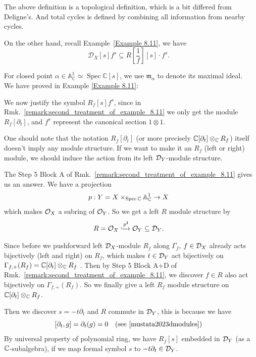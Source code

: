 The above definition is a topological definition, which is a bit differed from Deligne's. And total cycles is defined by combining all information from nearby cycles.


On the other hand, recall Example~\ref{Example 8.11}, we have
$$
    \mathcal{D}_{X}[s]f^{s} \subseteq R\left[\frac{1}{f}\right][s] \cdot f^{s}.
$$

For closed point $\alpha \in \mathbb{A}_{\mathbb{C}}^{1} \simeq \operatorname{Spec} \mathbb{C}[s]$, we use $\mathfrak{m}_{\alpha}$ to denote its maximal ideal. We have proved in Example \ref{Example 8.11}:

\begin{remark}\label{rmk:justify_R_f[s]f^s}
    We now justify the symbol $R_f[s]f^s$,
    since in Rmk.~\ref{remark:second_treatment_of_example_8.11} we only get the module $R_f[\partial_t]$,
    and $f^s$ represent the canonical section $1\otimes 1$.

    One should note that the notation $R_f[\partial_t]$ (or more precisely $\mathbb{C}[\partial_t]\otimes_{\mathbb{C}} R_f$) itself doesn't imply any module structure.
    If we want to make it an $R_f$ (left or right) module, we should induce the action from its left $\mathcal{D}_Y$-module structure.

    The Step 5 Block A of Rmk.~\ref{remark:second_treatment_of_example_8.11} gives us an answer.
    We have a projection
    \[
        p: Y = X\times_{\operatorname{Spec} \mathbb{C}}\mathbb{A}^1_{\mathbb{C}} \to X
    \]
    which makes $\mathcal{O}_X$ a subring of $\mathcal{O}_Y$.
    So we get a left $R$ module structure by
    \[
        R=\mathcal{O}_X\xhookrightarrow{p^\sharp} \mathcal{O}_Y \subseteq \mathcal{D}_Y.
    \]

    Since before we pushforward left $\mathcal{D}_X$-module $R_f$ along $\Gamma_f$,
    $f\in\mathcal{D}_X$ already acts bijectively (left and right) on $R_f$,
    which makes $t\in\mathcal{D}_Y$ act bijectively on $\Gamma_{f,+}(R_f) = \mathbb{C}[\partial_t] \otimes_{\mathbb{C}} R_f$ \cite[Lemma~2.1.5]{PopaDMBG2021}.
    Then by Step 5 Block A+D of Rmk.~\ref{remark:second_treatment_of_example_8.11},
    we discover $f\in R$ also act bijectively on $\Gamma_{f,+}(R_f)$.
    So we finally give a left $R_f$ module structure on $\mathbb{C}[\partial_t] \otimes_{\mathbb{C}} R_f$.

    Then we discover $s = -t\partial_t$ and $R$ commute in $\mathcal{D}_Y$, this is because we have
    \[
        [\partial_t, g] = \partial_t(g) = 0 \quad (\text{see  \cite[Prop~2.25(iii)]{mustata2023dmodules}})
    \]
    By universal property of polynomial ring, we have $R_f[s]$ embedded in $\mathcal{D}_Y$ (as a $\mathbb{C}$-subalgebra),
    if we map formal symbol $s$ to $-t\partial_t \in \mathcal{D}_Y$.


\end{remark}
